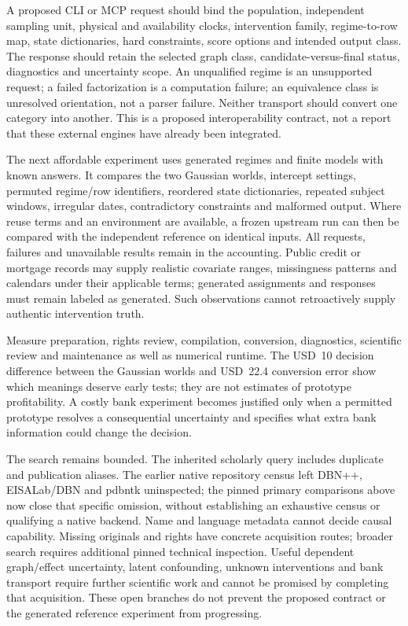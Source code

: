 A proposed CLI or MCP request should bind the population, independent sampling
unit, physical and availability clocks, intervention family, regime-to-row map,
state dictionaries, hard constraints, score options and intended output class.
The response should retain the selected graph class, candidate-versus-final
status, diagnostics and uncertainty scope. An unqualified regime is an
unsupported request; a failed factorization is a computation failure; an
equivalence class is unresolved orientation, not a parser failure. Neither
transport should convert one category into another. This is a proposed
interoperability contract, not a report that these external engines have
already been integrated. \citep{exec16_ct_design}

The next affordable experiment uses generated regimes and finite models with
known answers. It compares the two Gaussian worlds, intercept settings,
permuted regime/row identifiers, reordered state dictionaries, repeated subject
windows, irregular dates, contradictory constraints and malformed output.
Where reuse terms and an environment are available, a frozen upstream run can
then be compared with the independent reference on identical inputs. All
requests, failures and unavailable results remain in the accounting. Public
credit or mortgage records may supply realistic covariate ranges, missingness
patterns and calendars under their applicable terms; generated assignments
and responses must remain labeled as generated. Such observations cannot
retroactively supply authentic intervention truth.

Measure preparation, rights review, compilation, conversion, diagnostics,
scientific review and maintenance as well as numerical runtime. The USD~10
decision difference between the Gaussian worlds and USD~22.4 conversion error
show which meanings deserve early tests; they are not estimates of prototype
profitability. A costly bank experiment becomes justified only when a permitted
prototype resolves a consequential uncertainty and specifies what extra bank
information could change the decision. \citep{exec16_ct_oracle,exec16_ct_design}

The search remains bounded. The inherited scholarly query includes duplicate
and publication aliases. The earlier native repository census left DBN++,
EISALab/DBN and pdbntk uninspected; the pinned primary comparisons above now
close that specific omission, without establishing an exhaustive census or
qualifying a native backend. Name and language metadata cannot decide causal
capability. Missing originals and rights
have concrete acquisition routes; broader search requires additional pinned
technical inspection. Useful dependent graph/effect uncertainty, latent
confounding, unknown interventions and bank transport require further
scientific work and cannot be promised by completing that acquisition.
These open branches do not prevent the proposed contract or the generated
reference experiment from progressing. \citep{exec16_ct_design}
\label{exec16:cxx-temporal-end}
